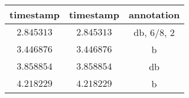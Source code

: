 \begin{tabular}{ccc}
    timestamp  & timestamp  & annotation     \\\hline
    $2.845313$ & $2.845313$ & db, $6/8$, $2$ \\
    $3.446876$ & $3.446876$ & b              \\
    $3.858854$ & $3.858854$ & db             \\
    $4.218229$ & $4.218229$ & b
\end{tabular}